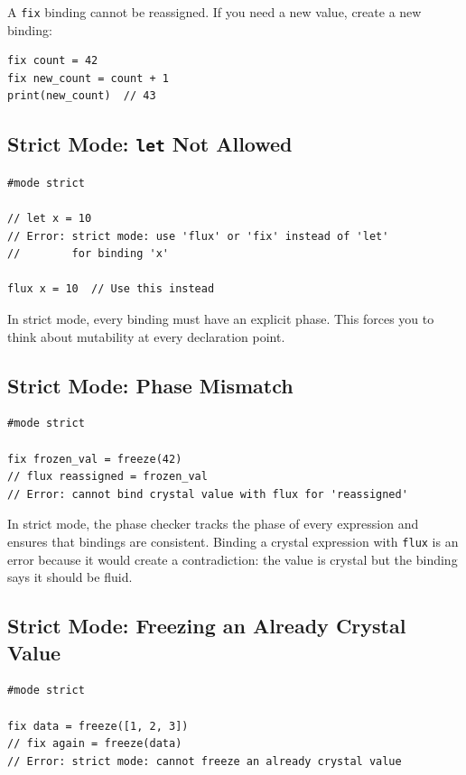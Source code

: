 A \lstinline|fix| binding cannot be reassigned.
If you need a new value, create a new binding:

\begin{lstlisting}[language=Lattice, caption={Working with crystal bindings}]
fix count = 42
fix new_count = count + 1
print(new_count)  // 43
\end{lstlisting}

\subsection{Strict Mode: \texttt{let} Not Allowed}

\begin{lstlisting}[language=Lattice, caption={Strict mode rejects \texttt{let}}]
#mode strict

// let x = 10
// Error: strict mode: use 'flux' or 'fix' instead of 'let'
//        for binding 'x'

flux x = 10  // Use this instead
\end{lstlisting}

In strict mode, every binding must have an explicit phase.
This forces you to think about mutability at every declaration point.

\subsection{Strict Mode: Phase Mismatch}

\begin{lstlisting}[language=Lattice, caption={Strict mode phase mismatch}]
#mode strict

fix frozen_val = freeze(42)
// flux reassigned = frozen_val
// Error: cannot bind crystal value with flux for 'reassigned'
\end{lstlisting}

In strict mode, the phase checker tracks the phase of every expression and ensures that bindings are consistent.
Binding a crystal expression with \lstinline|flux| is an error because it would create a contradiction: the value is crystal but the binding says it should be fluid.

\subsection{Strict Mode: Freezing an Already Crystal Value}

\begin{lstlisting}[language=Lattice, caption={Double-freeze error in strict mode}]
#mode strict

fix data = freeze([1, 2, 3])
// fix again = freeze(data)
// Error: strict mode: cannot freeze an already crystal value
\end{lstlisting}

